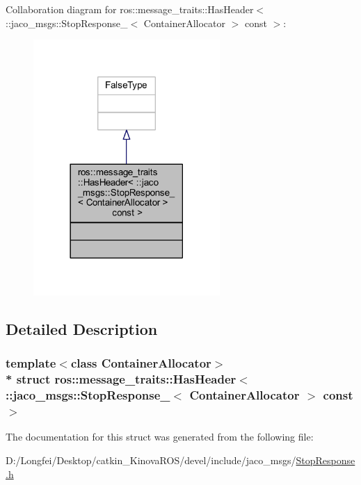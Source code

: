 Collaboration diagram for ros\+:\+:message\+\_\+traits\+:\+:Has\+Header$<$ \+:\+:jaco\+\_\+msgs\+:\+:Stop\+Response\+\_\+$<$ Container\+Allocator $>$ const $>$\+:
\nopagebreak
\begin{figure}[H]
\begin{center}
\leavevmode
\includegraphics[width=201pt]{d8/d78/structros_1_1message__traits_1_1HasHeader_3_01_1_1jaco__msgs_1_1StopResponse___3_01ContainerAllo5bc6ea3dfb269da513cb8a7eab738ef4}
\end{center}
\end{figure}


\subsection{Detailed Description}
\subsubsection*{template$<$class Container\+Allocator$>$\\*
struct ros\+::message\+\_\+traits\+::\+Has\+Header$<$ \+::jaco\+\_\+msgs\+::\+Stop\+Response\+\_\+$<$ Container\+Allocator $>$ const  $>$}



The documentation for this struct was generated from the following file\+:\begin{DoxyCompactItemize}
\item 
D\+:/\+Longfei/\+Desktop/catkin\+\_\+\+Kinova\+R\+O\+S/devel/include/jaco\+\_\+msgs/\hyperlink{StopResponse_8h}{Stop\+Response.\+h}\end{DoxyCompactItemize}
